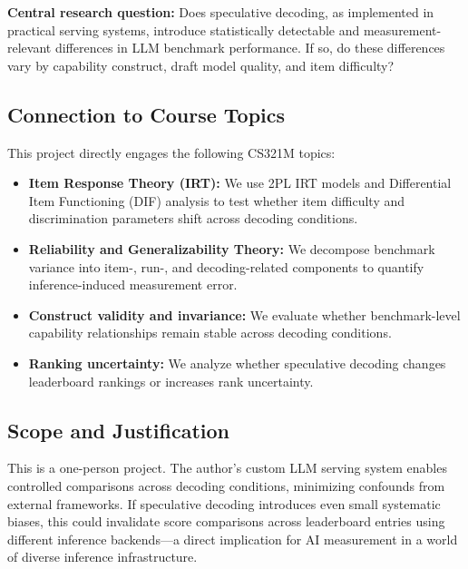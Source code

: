 \documentclass{article}
\begin{document}
\textbf{Central research question:} Does speculative decoding, as implemented in practical serving systems, introduce statistically detectable and measurement-relevant differences in LLM benchmark performance. If so, do these differences vary by capability construct, draft model quality, and item difficulty?

\subsection{Connection to Course Topics}

This project directly engages the following CS321M topics:

\begin{itemize}[leftmargin=1.5em]
    \item \textbf{Item Response Theory (IRT):} We use 2PL IRT models and Differential Item Functioning (DIF) analysis to test whether item difficulty and discrimination parameters shift across decoding conditions.
    
    \item \textbf{Reliability and Generalizability Theory:} We decompose benchmark variance into item-, run-, and decoding-related components to quantify inference-induced measurement error.
    
    \item \textbf{Construct validity and invariance:} We evaluate whether benchmark-level capability relationships remain stable across decoding conditions.
    
    \item \textbf{Ranking uncertainty:} We analyze whether speculative decoding changes leaderboard rankings or increases rank uncertainty.
\end{itemize}

\subsection{Scope and Justification}

This is a one-person project. The author's custom LLM serving system enables controlled comparisons across decoding conditions, minimizing confounds from external frameworks. If speculative decoding introduces even small systematic biases, this could invalidate score comparisons across leaderboard entries using different inference backends---a direct implication for AI measurement in a world of diverse inference infrastructure.

\end{document}
